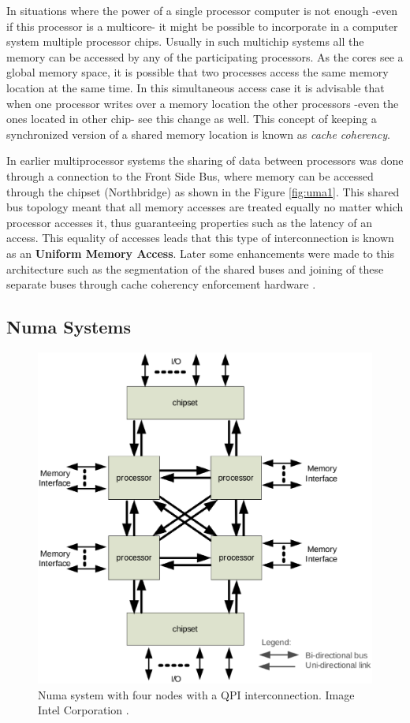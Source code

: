 In situations where the power of a single processor computer is not enough -even if this processor is a multicore- it might be possible to incorporate in a computer system multiple processor chips. Usually in such multichip systems all the memory can be accessed by any of the participating processors. As the cores see a global memory space, it is possible that two processes access the same memory location at the same time. In this simultaneous access case it is advisable that when one processor writes over a memory location the other processors -even the ones located in other chip- see this change as well. This concept of keeping a synchronized version of a shared memory location is known as \textit{cache coherency}. 

In earlier multiprocessor systems the sharing of data between processors was done through a connection to the Front Side Bus, where memory can be accessed through the chipset (Northbridge) as shown in the Figure \ref{fig:uma1}. This shared bus topology meant that all memory accesses are treated equally no matter which processor accesses it, thus guaranteeing properties such as the latency of an access. This equality of accesses leads that this type of interconnection is known as an \textbf{Uniform Memory Access}. Later some enhancements were made to this architecture such as the segmentation of the shared buses and joining of these separate buses through cache coherency enforcement hardware \cite{qpi-intel}.

\subsection{Numa Systems}\label{subsection:numa}

\begin{figure}[ht]
	\centering
		\includegraphics[width=.6\textwidth]{figures/numa-qpi.eps}
		\caption[Basic NUMA System]{Numa system with four nodes with a QPI interconnection. Image Intel Corporation \cite{qpi-intel}. }
		\label{fig:numa1}
\end{figure}

